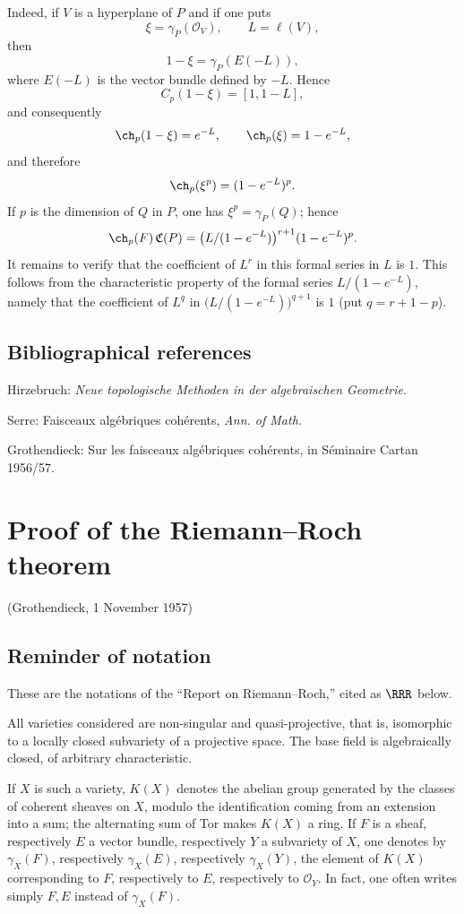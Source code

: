 Indeed, if \(V\) is a hyperplane of \(P\) and if one puts
\[
  \xi=\gamma_P(\mathcal O_V),\qquad L=\ell(V),
\]
then
\[
  1-\xi=\gamma_P(E(-L)),
\]
where \(E(-L)\) is the vector bundle defined by \(-L\). Hence
\[
  C_p(1-\xi)=[1,1-L],
\]
and consequently
\[
  \ch_p(1-\xi)=e^{-L},\qquad \ch_p(\xi)=1-e^{-L},
\]
and therefore
\[
  \ch_p(\xi^p)=(1-e^{-L})^p.
\]
If \(p\) is the dimension of \(Q\) in \(P\), one has \(\xi^p=\gamma_P(Q)\); hence
\[
  \ch_p(F)\,\mathfrak C(P)
  =
  \bigl(L/(1-e^{-L})\bigr)^{r+1}(1-e^{-L})^p.
\]
It remains to verify that the coefficient of \(L^r\) in this formal series in \(L\) is \(1\). This follows from the characteristic property of the formal series \(L/(1-e^{-L})\), namely that the coefficient of \(L^q\) in \(\bigl(L/(1-e^{-L})\bigr)^{q+1}\) is \(1\) (put \(q=r+1-p\)).

\subsection*{Bibliographical references}
\begin{enumerate}[label={[\arabic*]}]
\item Hirzebruch: \emph{Neue topologische Methoden in der algebraischen Geometrie}.
\item Serre: Faisceaux algébriques cohérents, \emph{Ann. of Math.}
\item Grothendieck: Sur les faisceaux algébriques cohérents, in Séminaire Cartan 1956/57.
\end{enumerate}

\section*{Proof of the Riemann--Roch theorem}
\begin{center}
(Grothendieck, 1 November 1957)
\end{center}

\subsection*{Reminder of notation}
These are the notations of the ``Report on Riemann--Roch,'' cited as \(\RRR\) below.

All varieties considered are non-singular and quasi-projective, that is, isomorphic to a locally closed subvariety of a projective space. The base field is algebraically closed, of arbitrary characteristic.

If \(X\) is such a variety, \(K(X)\) denotes the abelian group generated by the classes of coherent sheaves on \(X\), modulo the identification coming from an extension into a sum; the alternating sum of Tor makes \(K(X)\) a ring. If \(F\) is a sheaf, respectively \(E\) a vector bundle, respectively \(Y\) a subvariety of \(X\), one denotes by \(\gamma_X(F)\), respectively \(\gamma_X(E)\), respectively \(\gamma_X(Y)\), the element of \(K(X)\) corresponding to \(F\), respectively to \(E\), respectively to \(\mathcal O_Y\). In fact, one often writes simply \(F,E\) instead of \(\gamma_X(F)\).


